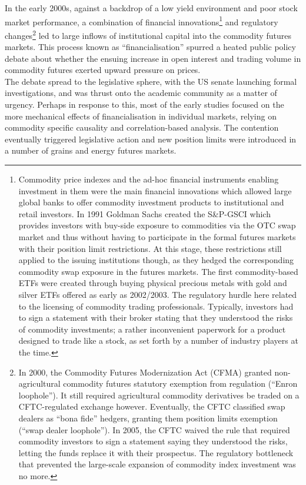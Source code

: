 \documentclass[]{elsarticle} %
\begin{document}
In the early 2000s, against a backdrop of a low yield environment and poor stock market performance, a combination of financial innovations\footnote{Commodity price indexes and the ad-hoc financial instruments enabling investment in them were the main financial innovations which allowed large global banks to offer commodity investment products to institutional and retail investors. In 1991 Goldman Sachs created the S\&P-GSCI which provides investors with buy-side exposure to commodities via the OTC swap market and thus without having to participate in the formal futures markets with their position limit restrictions. At this stage, these restrictions still applied to the issuing institutions though, as they hedged the corresponding commodity swap exposure in the futures markets. The first commodity-based ETFs were created through buying physical precious metals with gold and silver ETFs offered as early as 2002/2003. The regulatory hurdle here related to the licensing of commodity trading professionals. Typically, investors had to sign a statement with their broker stating that they understood the risks of commodity investments; a rather inconvenient paperwork for a product designed to trade like a stock, as set forth by a number of industry players at the time.} and regulatory changes\footnote{In 2000, the Commodity Futures Modernization Act (CFMA) granted non-agricultural commodity futures statutory exemption from regulation (``Enron loophole''). It still required agricultural commodity derivatives be traded on a CFTC-regulated exchange however. Eventually, the CFTC classified swap dealers as ``bona fide'' hedgers, granting them position limits exemption (``swap dealer loophole''). In 2005, the CFTC waived the rule that required commodity investors to sign a statement saying they understood the risks, letting the funds replace it with their prospectus. The regulatory bottleneck that prevented the large-scale expansion of commodity index investment was no more.} led to large inflows of institutional capital into the commodity futures markets. This process known as ``financialisation'' spurred a heated public policy debate about whether the ensuing increase in open interest and trading volume in commodity futures exerted upward pressure on prices.\\
The debate spread to the legislative sphere, with the US senate launching formal investigations, and was thrust onto the academic community as a matter of urgency. Perhaps in response to this, most of the early studies focused on the more mechanical effects of financialisation in individual markets, relying on commodity specific causality and correlation-based analysis. The contention eventually triggered legislative action and new position limits were introduced in a number of grains and energy futures markets.
\end{document}
